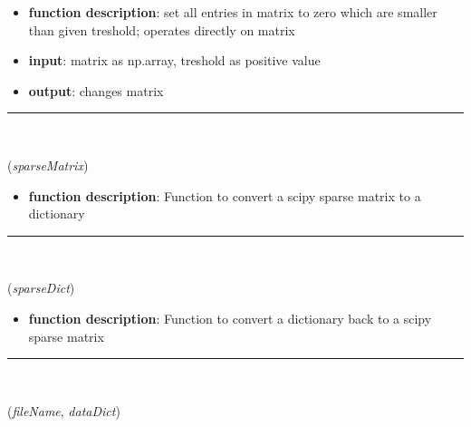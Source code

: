 \begin{itemize}[leftmargin=1.4cm]
\begin{itemize}[leftmargin=0.7cm]
\item[--]
{\bf function description}: set all entries in matrix to zero which are smaller than given treshold; operates directly on matrix
\item[--]
{\bf input}: matrix as np.array, treshold as positive value
\item[--]
{\bf output}: changes matrix
\vspace{12pt}\end{itemize}
%
\noindent\rule{8cm}{0.75pt}\vspace{1pt} \\ 
\begin{flushleft}
\label{sec:advancedUtilities:ConvertScipySparseToDict}
({\it sparseMatrix})
\end{flushleft}
\setlength{\itemindent}{0.7cm}
\begin{itemize}[leftmargin=0.7cm]
\item[--]
{\bf function description}: Function to convert a scipy sparse matrix to a dictionary
\vspace{12pt}\end{itemize}
%
\noindent\rule{8cm}{0.75pt}\vspace{1pt} \\ 
\begin{flushleft}
\label{sec:advancedUtilities:ConvertDictToScipySparse}
({\it sparseDict})
\end{flushleft}
\setlength{\itemindent}{0.7cm}
\begin{itemize}[leftmargin=0.7cm]
\item[--]
{\bf function description}: Function to convert a dictionary back to a scipy sparse matrix
\vspace{12pt}\end{itemize}
%
\noindent\rule{8cm}{0.75pt}\vspace{1pt} \\ 
\begin{flushleft}
\label{sec:advancedUtilities:SaveDictToHDF5}
({\it fileName}, {\it dataDict})
\end{flushleft}
\setlength{\itemindent}{0.7cm}
\begin{itemize}[leftmargin=0.7cm]

\end{itemize}
\end{itemize}

